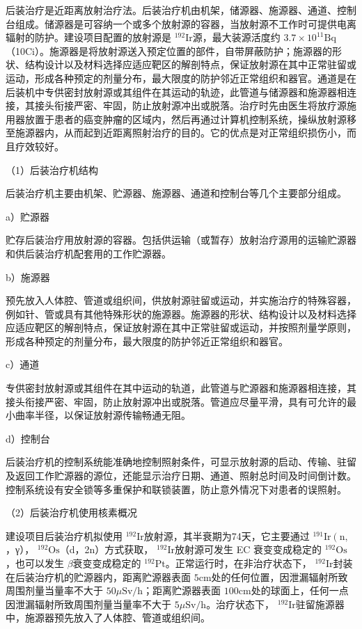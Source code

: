后装治疗是近距离放射治疗法。后装治疗机由机架，储源器、施源器、通道、控制台组成。储源器是可容纳一个或多个放射源的容器，当放射源不工作时可提供电离辐射的防护。建设项目配置的放射源是 $^ { 1 9 2 } \mathrm { I r }$源，最大装源活度约 $3.7 {\times} 10 ^ {11} \mathrm {Bq}$（10Ci）。施源器是将放射源送入预定位置的部件，自带屏蔽防护；施源器的形状、结构设计以及材料选择应适应靶区的解剖特点，保证放射源在其中正常驻留或运动，形成各种预定的剂量分布，最大限度的防护邻近正常组织和器官。通道是在后装机中专供密封放射源或其组件在其运动的轨迹，此管道与储源器和施源器相连接，其接头衔接严密、牢固，防止放射源冲出或脱落。治疗时先由医生将放疗源施用器放置于患者的癌变肿瘤的区域内，然后再通过计算机控制系统，操纵放射源移至施源器内，从而起到近距离照射治疗的目的。它的优点是对正常组织损伤小，而且疗效较好。

（1）后装治疗机结构

后装治疗机主要由机架、贮源器、施源器、通道和控制台等几个主要部分组成。

a）贮源器

贮存后装治疗用放射源的容器。包括供运输（或暂存）放射治疗源用的运输贮源器和供后装治疗机配套用的工作贮源器。

b）施源器

预先放入人体腔、管道或组织间，供放射源驻留或运动，并实施治疗的特殊容器，例如针、管或具有其他特殊形状的施源器。施源器的形状、结构设计以及材料选择应适应靶区的解剖特点，保证放射源在其中正常驻留或运动，并按照剂量学原则，形成各种预定的剂量分布，最大限度的防护邻近正常组织和器官。

c）通道

专供密封放射源或其组件在其中运动的轨道，此管道与贮源器和施源器相连接，其接头衔接严密、牢固，防止放射源冲出或脱落。管道应尽量平滑，具有可允许的最小曲率半径，以保证放射源传输畅通无阻。

d）控制台

后装治疗机的控制系统能准确地控制照射条件，可显示放射源的启动、传输、驻留及返回工作贮源器的源位，还能显示治疗日期、通道、照射总时间及时间倒计数。控制系统设有安全锁等多重保护和联锁装置，防止意外情况下对患者的误照射。

（2）后装治疗机使用核素概况

建设项目后装治疗机拟使用 $^ { 1 9 2 } \mathrm { I r }$放射源，其半衰期为74天，它主要通过 $^ { 1 9 1 } \mathrm { I r } \left( \mathrm { n } , \right.$，γ）， $^ { 1 9 2 } \mathrm { O s }$（d，2n）方式获取， $^ { 1 9 2 } \mathrm { I r }$放射源可发生 EC 衰变变成稳定的 $^ { 1 9 2 } \mathrm { O s }$，也可以发生 $\beta$衰变变成稳定的 $^ { 1 9 2 } \mathrm { { P t } }$。正常运行时，在非治疗状态下， $^ { 1 9 2 } \mathrm { I r }$封装在后装治疗机的贮源器内，距离贮源器表面 $5 \mathrm { c m }$处的任何位置，因泄漏辐射所致周围剂量当量率不大于 $5 0 \mu \mathrm { S v / h }$；距离贮源器表面 $1 0 0 \mathrm { c m }$处的球面上，任何一点因泄漏辐射所致周围剂量当量率不大于 $5 \mu \mathrm { S v / h }$。治疗状态下， $^ { 1 9 2 } \mathrm { I r }$驻留施源器中，施源器预先放入了人体腔、管道或组织间。

